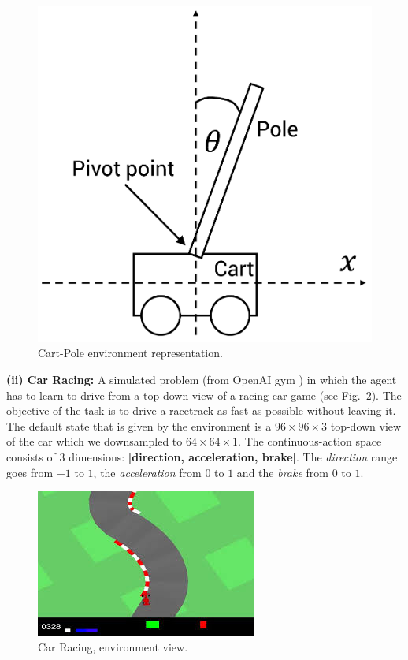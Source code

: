 \begin{figure}[h]
    \centering
    \includegraphics[scale=0.27]{imagenes/cap2/cartpole.pdf}
    \caption{Cart-Pole environment representation.}
    \label{fig:cartpole}
\end{figure}


\textbf{(ii) Car Racing:} A simulated problem (from OpenAI gym \cite{brockman2016openai}) in which the agent has to learn to drive from a top-down view of a racing car game (see Fig.~\ref{fig:Car_Racing}). The objective of the task is to drive a racetrack as fast as possible without leaving it. The default state that is given by the environment is a $96\times96\times3$ top-down view of the car which we downsampled to $64\times64\times1$. The continuous-action space consists of 3 dimensions: \textbf{[direction, acceleration, brake]}. The \emph{direction} range goes from $-1$ to $1$, the \emph{acceleration} from $0$ to $1$ and the \emph{brake} from $0$ to $1$.

\begin{figure}[h]
    \centering
    \includegraphics[scale=0.7]{imagenes/cap3/car_racing_env.jpg}
    \caption{Car Racing, environment view.}
    \label{fig:Car_Racing}
\end{figure}

